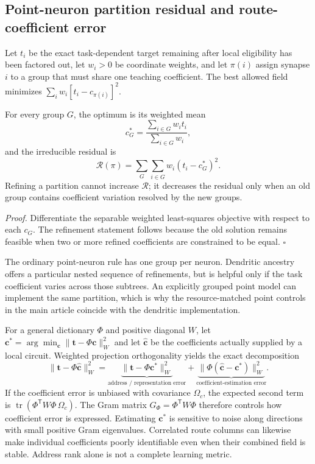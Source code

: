 \subsection{Point-neuron partition residual and route-coefficient error}

Let $t_i$ be the exact task-dependent target remaining after local
eligibility has been factored out, let $w_i>0$ be coordinate weights, and let
$\pi(i)$ assign synapse $i$ to a group that must share one teaching
coefficient. The best allowed field minimizes
$\sum_iw_i[t_i-c_{\pi(i)}]^2$.

\begin{proposition}
For every group $G$, the optimum is its weighted mean
\begin{equation}
c_G^*=\frac{\sum_{i\in G}w_it_i}{\sum_{i\in G}w_i},
\end{equation}
and the irreducible residual is
\begin{equation}
\mathcal R(\pi)=\sum_G\sum_{i\in G}w_i(t_i-c_G^*)^2.
\label{eq:s_partition_variance}
\end{equation}
Refining a partition cannot increase $\mathcal R$; it decreases the residual
only when an old group contains coefficient variation resolved by the new
groups.
\end{proposition}

\noindent\emph{Proof.}
Differentiate the separable weighted least-squares objective with respect to
each $c_G$. The refinement statement follows because the old solution remains
feasible when two or more refined coefficients are constrained to be equal.
\hfill$\square$

The ordinary point-neuron rule has one group per neuron. Dendritic ancestry
offers a particular nested sequence of refinements, but is helpful only if the
task coefficient varies across those subtrees. An explicitly grouped point
model can implement the same partition, which is why the resource-matched
point controls in the main article coincide with the dendritic implementation.

For a general dictionary $\Phi$ and positive diagonal $W$, let
$\bm c^*=\arg\min_{\bm c}\lVert\bm t-\Phi\bm c\rVert_W^2$ and let
$\widehat{\bm c}$ be the coefficients actually supplied by a local circuit.
Weighted projection orthogonality yields the exact decomposition
\begin{equation}
\lVert\bm t-\Phi\widehat{\bm c}\rVert_W^2
=\underbrace{\lVert\bm t-\Phi\bm c^*\rVert_W^2}_{\text{address / representation error}}
+\underbrace{\lVert \Phi(\widehat{\bm c}-\bm c^*)\rVert_W^2}_{\text{coefficient-estimation error}}.
\label{eq:s_field_error_decomposition}
\end{equation}
If the coefficient error is unbiased with covariance $\Omega_c$, the expected
second term is
$\operatorname{tr}(\Phi^{\mathsf T}W\Phi\,\Omega_c)$. The Gram matrix
$G_\Phi=\Phi^{\mathsf T}W\Phi$ therefore controls how coefficient error is expressed.
Estimating $\bm c^*$ is sensitive to noise along directions with small
positive Gram eigenvalues. Correlated route columns can likewise make
individual coefficients poorly identifiable even when their combined field
is stable. Address rank alone is
not a complete learning metric.


